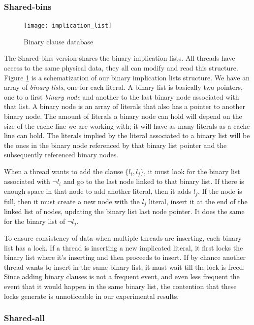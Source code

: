 \subsubsection{Shared-bins}

\begin{figure}[tp]
  \centering
  \texttt{[image: implication\_list]}
  \caption{Binary clause database}
  \label{fig:shared bins}
\end{figure}

The Shared-bins version shares the binary implication lists. All threads 
have access to the same physical data, they all can modify and read this 
structure. Figure \ref{fig:shared bins} is a schematization of our 
binary implication lists structure. We have an array of \textit{binary 
lists}, one for each literal. A binary list is basically two pointers, 
one to a first \textit{binary node} and another to the last binary node 
associated with that list. A 
binary node is an array of literals that also has a pointer to another 
binary node. The amount of literals a binary node can hold will depend 
on the size of the cache line we are working with; it will have as many 
literals as a cache line can hold. The literals implied by the literal 
associated to a binary list will be the ones in the binary node 
referenced by that binary list pointer and the subsequently referenced 
binary nodes. 

When a thread wants to add the clause $\{l_i,l_j\}$, it must look for 
the binary list associated with $\neg l_i$ and go to the last node linked 
to that binary list. If there is enough space in that node to add 
another literal, then it adds $l_j$. If the node is full, then it must 
create a new node with the $l_j$ literal, insert it at the end of the 
linked list of nodes, 
updating the binary list last node pointer. It does the same for the 
binary list of $\neg l_j$.

To ensure consistency of 
data when multiple threads are inserting, each binary list has a lock. 
If a thread is inserting a new implicated literal, it first locks the 
binary list where it's inserting and then proceeds to insert. If by 
chance another thread wants to insert in the same binary list, it must 
wait till the lock is freed. Since adding binary clauses is not a 
frequent event, and even less frequent the event that it would happen 
in the same binary list, the contention that these locks generate is 
unnoticeable in our experimental results.


\subsubsection{Shared-all}

